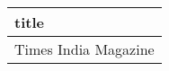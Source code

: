 \begin{longtable}[]{@{}l@{}}
\toprule
title \\
\midrule
\endhead
Times India Magazine \\
\bottomrule
\end{longtable}
